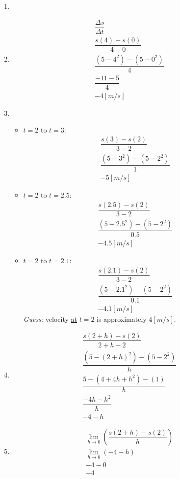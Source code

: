 \begin{enumerate}
    \item {}
    \item \begin{gather*}
        \dfrac{\Delta s}{\Delta t} \\
        \dfrac{s(4) - s(0)}{4 - 0} \\
        \dfrac{\left(5 - 4^2 \right) - \left(5 - 0^2\right)}{4} \\
        \dfrac{-11 - 5}{4} \\
        -4 [m/s]
    \end{gather*}
    \item \begin{itemize}
        \item $t = 2$ to $t = 3$:\begin{gather*}
            \dfrac{s(3) - s(2)}{3 - 2} \\
            \dfrac{\left(5 - 3^2\right) - \left(5 - 2^2\right)}{1} \\
            -5 [m/s]
        \end{gather*}
        \item $t = 2$ to $t = 2.5$:\begin{gather*}
            \dfrac{s(2.5) - s(2)}{3 - 2} \\
            \dfrac{\left(5 - 2.5^2\right) - \left(5 - 2^2\right)}{0.5} \\
            -4.5 [m/s]
        \end{gather*}
        \item $t = 2$ to $t = 2.1$:\begin{gather*}
            \dfrac{s(2.1) - s(2)}{3 - 2} \\
            \dfrac{\left(5 - 2.1^2\right) - \left(5 - 2^2\right)}{0.1} \\
            -4.1 [m/s]
        \end{gather*}
        \textit{Guess:} velocity \underline{at} $t = 2$ is approximately $4[m/s]$.
    \end{itemize}
    \item \begin{gather*}
        \dfrac{s(2 + h) - s(2)}{2 + h - 2} \\
        \dfrac{\left(5 - \left(2 + h\right)^2\right) - \left(5 - 2^2\right)}{h} \\
        \dfrac{5 - \left(4 + 4h + h^2\right) - \left(1\right)}{h} \\
        \dfrac{-4h - h^2}{h} \\
        -4 - h
    \end{gather*}
    \item \begin{gather*}
        \lim_{h \to 0} \left(\dfrac{s(2 + h) - s(2)}{h}\right) \\
        \lim_{h \to 0} \left(-4 - h\right) \\
        -4 - 0 \\
        -4
    \end{gather*}
\end{enumerate}
